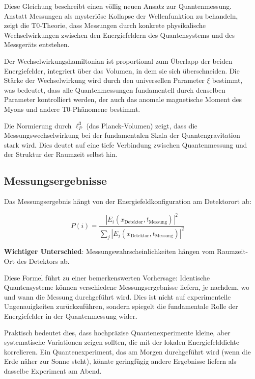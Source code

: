 \documentclass[12pt,a4paper]{article}
\newcommand{\xipar}{\xi}
\theoremstyle{definition}
\theoremstyle{remark}
\begin{document}
Diese Gleichung beschreibt einen v{\"o}llig neuen Ansatz zur Quantenmessung. Anstatt Messungen als mysteri{\"o}se Kollapse der Wellenfunktion zu behandeln, zeigt die T0-Theorie, dass Messungen durch konkrete physikalische Wechselwirkungen zwischen den Energiefeldern des Quantensystems und des Messger{\"a}ts entstehen.

Der Wechselwirkungshamiltonian ist proportional zum {\"U}berlapp der beiden Energiefelder, integriert {\"u}ber das Volumen, in dem sie sich {\"u}berschneiden. Die St{\"a}rke der Wechselwirkung wird durch den universellen Parameter $\xipar$ bestimmt, was bedeutet, dass alle Quantenmessungen fundamentell durch denselben Parameter kontrolliert werden, der auch das anomale magnetische Moment des Myons und andere T0-Ph{\"a}nomene bestimmt.

Die Normierung durch $\ell_P^3$ (das Planck-Volumen) zeigt, dass die Messungswechselwirkung bei der fundamentalen Skala der Quantengravitation stark wird. Dies deutet auf eine tiefe Verbindung zwischen Quantenmessung und der Struktur der Raumzeit selbst hin.

\subsection{Messungsergebnisse}

Das Messungsergebnis h{\"a}ngt von der Energiefeldkonfiguration am Detektorort ab:

\begin{equation}
	P(i) = \frac{|E_i(x_{\text{Detektor}}, t_{\text{Messung}})|^2}{\sum_j |E_j(x_{\text{Detektor}}, t_{\text{Messung}})|^2}
	\label{eq:measurement_probability}
\end{equation}

\textbf{Wichtiger Unterschied}: Messungswahrscheinlichkeiten h{\"a}ngen vom Raumzeit-Ort des Detektors ab.

Diese Formel f{\"u}hrt zu einer bemerkenswerten Vorhersage: Identische Quantensysteme k{\"o}nnen verschiedene Messungsergebnisse liefern, je nachdem, wo und wann die Messung durchgef{\"u}hrt wird. Dies ist nicht auf experimentelle Ungenauigkeiten zur{\"u}ckzuf{\"u}hren, sondern spiegelt die fundamentale Rolle der Energiefelder in der Quantenmessung wider.

Praktisch bedeutet dies, dass hochpr{\"a}zise Quantenexperimente kleine, aber systematische Variationen zeigen sollten, die mit der lokalen Energiefelddichte korrelieren. Ein Quantenexperiment, das am Morgen durchgef{\"u}hrt wird (wenn die Erde n{\"a}her zur Sonne steht), k{\"o}nnte geringf{\"u}gig andere Ergebnisse liefern als dasselbe Experiment am Abend.
\end{document}
